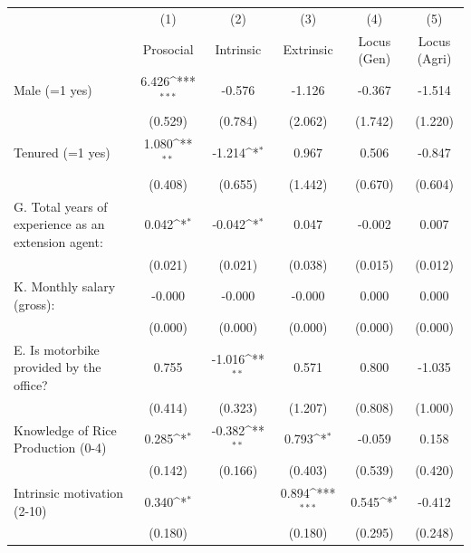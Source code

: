 {
\def\sym#1{\ifmmode^{#1}\else\(^{#1}\)\fi}
\begin{tabular}{l*{5}{c}}
\hline\hline
                    &\multicolumn{1}{c}{(1)}         &\multicolumn{1}{c}{(2)}         &\multicolumn{1}{c}{(3)}         &\multicolumn{1}{c}{(4)}         &\multicolumn{1}{c}{(5)}         \\
                    &Prosocial         &Intrinsic         &Extrinsic         &Locus (Gen)         &Locus (Agri)         \\
\hline
Male (=1 yes)       &6.426\sym{***}&-0.576         &-1.126         &-0.367         &-1.514         \\
                    &(0.529)         &(0.784)         &(2.062)         &(1.742)         &(1.220)         \\
Tenured (=1 yes)    &1.080\sym{**} &-1.214\sym{*}  &0.967         &0.506         &-0.847         \\
                    &(0.408)         &(0.655)         &(1.442)         &(0.670)         &(0.604)         \\
G. Total years of experience as an extension agent:&0.042\sym{*}  &-0.042\sym{*}  &0.047         &-0.002         &0.007         \\
                    &(0.021)         &(0.021)         &(0.038)         &(0.015)         &(0.012)         \\
K. Monthly salary (gross):&-0.000         &-0.000         &-0.000         &0.000         &0.000         \\
                    &(0.000)         &(0.000)         &(0.000)         &(0.000)         &(0.000)         \\
E. Is motorbike provided by the office?&0.755         &-1.016\sym{**} &0.571         &0.800         &-1.035         \\
                    &(0.414)         &(0.323)         &(1.207)         &(0.808)         &(1.000)         \\
Knowledge of Rice Production (0-4)&0.285\sym{*}  &-0.382\sym{**} &0.793\sym{*}  &-0.059         &0.158         \\
                    &(0.142)         &(0.166)         &(0.403)         &(0.539)         &(0.420)         \\
Intrinsic motivation (2-10)&0.340\sym{*}  &              &0.894\sym{***}&0.545\sym{*}  &-0.412         \\
                    &(0.180)         &              &(0.180)         &(0.295)         &(0.248)         \\

\end{tabular}}
